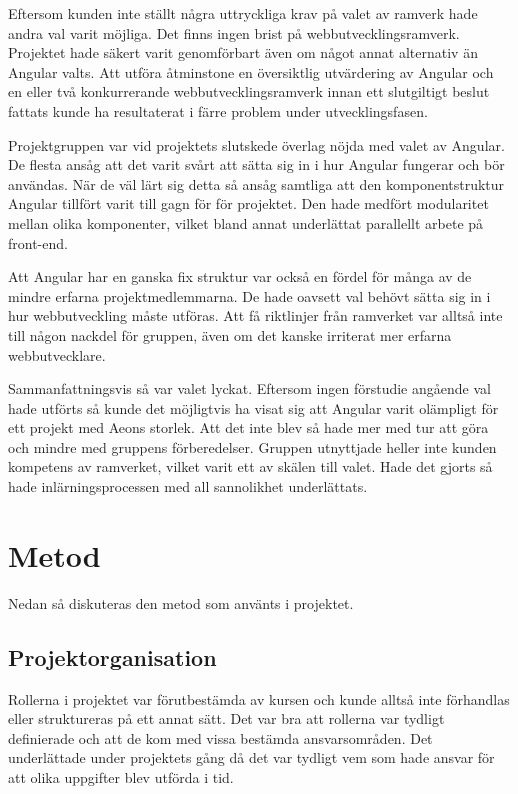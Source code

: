 Eftersom kunden inte ställt några uttryckliga krav på valet av ramverk hade andra val varit möjliga. Det finns ingen brist på webbutvecklingsramverk. Projektet hade säkert varit genomförbart även om något annat alternativ än Angular valts. Att utföra åtminstone en översiktlig utvärdering av Angular och en eller två konkurrerande webbutvecklingsramverk innan ett slutgiltigt beslut fattats kunde ha resultaterat i färre problem under utvecklingsfasen.

Projektgruppen var vid projektets slutskede överlag nöjda med valet av Angular. De flesta ansåg att det varit svårt att sätta sig in i hur Angular fungerar och bör användas. När de väl lärt sig detta så ansåg samtliga att den komponentstruktur Angular tillfört varit till gagn för för projektet. Den hade medfört modularitet mellan olika komponenter, vilket bland annat underlättat parallellt arbete på front-end.

Att Angular har en ganska fix struktur var också en fördel för många av de mindre erfarna projektmedlemmarna. De hade oavsett val behövt sätta sig in i hur webbutveckling måste utföras. Att få riktlinjer från ramverket var alltså inte till någon nackdel för gruppen, även om det kanske irriterat mer erfarna webbutvecklare.

Sammanfattningsvis så var valet lyckat. Eftersom ingen förstudie angående val hade utförts så kunde det möjligtvis ha visat sig att Angular varit olämpligt för ett projekt med Aeons storlek. Att det inte blev så hade mer med tur att göra och mindre med gruppens förberedelser. Gruppen utnyttjade heller inte kunden kompetens av ramverket, vilket varit ett av skälen till valet. Hade det gjorts så hade inlärningsprocessen med all sannolikhet underlättats.

\section{Metod}
Nedan så diskuteras den metod som använts i projektet.

\subsection{Projektorganisation}
Rollerna i projektet var förutbestämda av kursen och kunde alltså inte förhandlas eller struktureras på ett annat sätt. Det var bra att rollerna var tydligt definierade och att de kom med vissa bestämda ansvarsområden. Det underlättade under projektets gång då det var tydligt vem som hade ansvar för att olika uppgifter blev utförda i tid.

